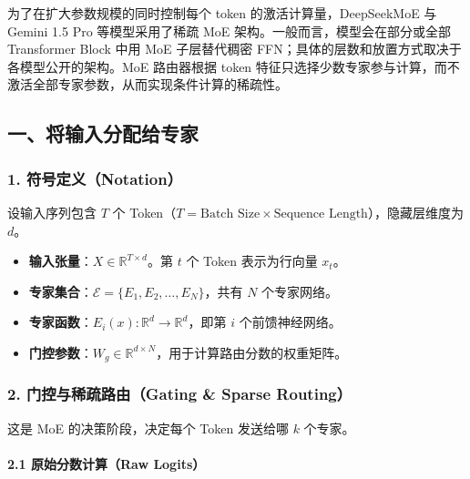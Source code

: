 为了在扩大参数规模的同时控制每个 token 的激活计算量，DeepSeekMoE 与 Gemini 1.5 Pro 等模型采用了稀疏 MoE 架构。一般而言，模型会在部分或全部 Transformer Block 中用 MoE 子层替代稠密 FFN；具体的层数和放置方式取决于各模型公开的架构。MoE 路由器根据 token 特征只选择少数专家参与计算，而不激活全部专家参数，从而实现条件计算的稀疏性。

\hypertarget{ux4e00ux5c06ux8f93ux5165ux5206ux914dux7ed9ux4e13ux5bb6}{%
\subsection{一、将输入分配给专家}\label{ux4e00ux5c06ux8f93ux5165ux5206ux914dux7ed9ux4e13ux5bb6}}

\hypertarget{ux7b26ux53f7ux5b9aux4e49notation}{%
\subsubsection{1. 符号定义（Notation）}\label{ux7b26ux53f7ux5b9aux4e49notation}}

设输入序列包含 \(T\) 个 Token（\(T=\text{Batch Size} \times \text{Sequence Length}\)），隐藏层维度为 \(d\)。

\begin{itemize}
\tightlist
\item
  \textbf{输入张量}：\(X \in \mathbb{R}^{T \times d}\)。第 \(t\) 个 Token 表示为行向量 \(x_t\)。
\item
  \textbf{专家集合}：\(\mathcal{E}=\{E_1,E_2,\ldots,E_N\}\)，共有 \(N\) 个专家网络。
\item
  \textbf{专家函数}：\(E_i(x): \mathbb{R}^d \to \mathbb{R}^d\)，即第 \(i\) 个前馈神经网络。
\item
  \textbf{门控参数}：\(W_g \in \mathbb{R}^{d \times N}\)，用于计算路由分数的权重矩阵。
\end{itemize}

\hypertarget{ux95e8ux63a7ux4e0eux7a00ux758fux8defux7531gating-sparse-routing}{%
\subsubsection{2. 门控与稀疏路由（Gating \& Sparse Routing）}\label{ux95e8ux63a7ux4e0eux7a00ux758fux8defux7531gating-sparse-routing}}

这是 MoE 的决策阶段，决定每个 Token 发送给哪 \(k\) 个专家。

\hypertarget{ux539fux59cbux5206ux6570ux8ba1ux7b97raw-logits}{%
\paragraph{2.1 原始分数计算（Raw Logits）}\label{ux539fux59cbux5206ux6570ux8ba1ux7b97raw-logits}}

